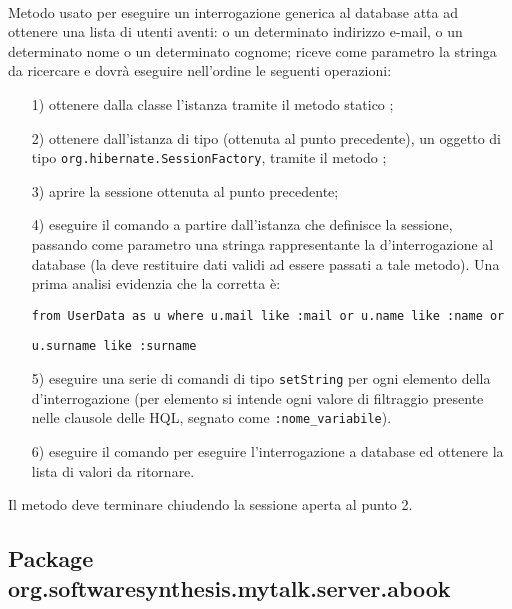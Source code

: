 \begin{description}
	
	\item{}\\
		Metodo usato per eseguire un interrogazione generica al database atta ad ottenere una lista di utenti aventi: o un determinato indirizzo e-mail, o un determinato nome o un determinato cognome; riceve come parametro la stringa da ricercare e dovrà eseguire nell'ordine le seguenti operazioni:
		\begin{itemize}
			\item[1)] ottenere dalla classe  l'istanza tramite il metodo statico ;
			\item[2)] ottenere dall'istanza di tipo (ottenuta al punto precedente), un oggetto di tipo \texttt{org.hibernate.SessionFactory}, tramite il metodo ;
			\item[3)] aprire la sessione ottenuta al punto precedente;
			\item[4)] eseguire il comando  a partire dall'istanza che definisce la sessione, passando come parametro una stringa rappresentante la  d'interrogazione al database (la  deve restituire dati validi ad essere passati a tale metodo). Una prima analisi evidenzia che la  corretta è: 
\begin{verbatim}
from UserData as u where u.mail like :mail or u.name like :name or
\end{verbatim}
\begin{verbatim}
u.surname like :surname
\end{verbatim}
			\item[5)] eseguire una serie di comandi di tipo \texttt{setString} per ogni elemento della  d'interrogazione (per elemento si intende ogni valore di filtraggio presente nelle clausole  delle  HQL, segnato come \texttt{:nome\_variabile}).
			\item[6)] eseguire il comando  per eseguire l'interrogazione a database ed ottenere la lista di valori da ritornare.
		\end{itemize}
		
Il metodo deve terminare chiudendo la sessione aperta al punto 2.

\end{description}

\subsection{Package org.softwaresynthesis.mytalk.server.abook}\label{sec:abook}

